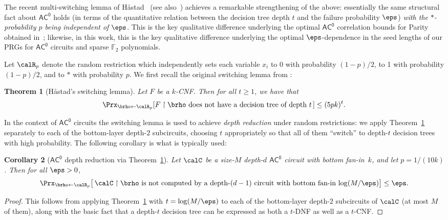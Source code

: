 \documentclass[11pt]{article}
\numberwithin{equation}{section}
\newtheorem{theorem}{Theorem}[section]
\newtheorem{corollary}[theorem]{Corollary}
\theoremstyle{definition}
\theoremstyle{plain}
\theoremstyle{plain}
\newcommand{\acz}{\mathsf{AC^0}}
\newcommand{\uhr}{\upharpoonright}
\renewcommand{\F}{\mathds{F}}
\begin{document}
The recent multi-switching lemma of H{\aa}stad~\cite{Has14} (see also~\cite{IMP12}) achieves a remarkable strengthening of the above: essentially the same structural fact about $\acz$ holds (in terms of the quantitative relation between the decision tree depth $t$ and the failure probability $\eps$) \emph{with the $\ast$-probability $p$ being independent of $\eps$}. This is the key qualitative difference underlying the optimal $\acz$ correlation bounds for {\sc Parity} obtained in~\cite{IMP12,Has14}; likewise, in this work, this is the key qualitative difference underlying the optimal $\eps$-dependence in the seed lengths of our PRGs for $\acz$ circuits and sparse $\F_2$ polynomials.\medskip 



Let $\calR_p$ denote the random restriction which independently sets each variable $x_i$ to $0$ with probability
$(1-p)/2$, to 1 with probability $(1-p)/2$, and to $\ast$ with probability $p.$  We first recall the original switching lemma
from \cite{Hastad86}:

\begin{theorem}[H{\aa}stad's switching lemma]
\label{thm:HSL}
Let $F$ be a $k$-CNF. Then for all $t \ge 1$, we have that 
\[ \Prx_{\brho\leftarrow\calR_p}[F\uhr\brho \text{~does not have a decision tree of depth~}t\, ] \le (5pk)^t. \] 
\end{theorem} 

In the context of $\acz$ circuits the switching lemma is used to achieve \emph{depth reduction} under random restrictions: we apply Theorem~\ref{thm:HSL} separately to each of the bottom-layer depth-$2$ subcircuits, choosing $t$ appropriately so that all of them ``switch'' to depth-$t$ decision trees with high probability.  The following corollary is what is typically used:

\begin{corollary}[$\acz$ depth reduction via Theorem~\ref{thm:HSL}]
\label{cor:HSL-depth-reduction} 
Let $\calC$ be a size-$M$ depth-$d$ $\acz$ circuit with bottom fan-in~$k$, and let $p = 1/(10k)$.  Then for all $\eps > 0$,
\[ \Prx_{\brho\leftarrow\calR_p}\big[\, \text{$\calC \uhr \brho$ is not computed by a depth-$(d-1)$ circuit with bottom fan-in $\log(M/\eps)$}\big] \le \eps.\] 
\end{corollary}

\begin{proof}
This follows from applying Theorem~\ref{thm:HSL} with $t = \log(M/\eps)$ to each of the bottom-layer depth-$2$ subcircuits of $\calC$ (at most $M$ of them), along with the basic fact that a depth-$t$ decision tree can be expressed as both a $t$-DNF as well as a $t$-CNF. 
\end{proof} 
\end{document}
